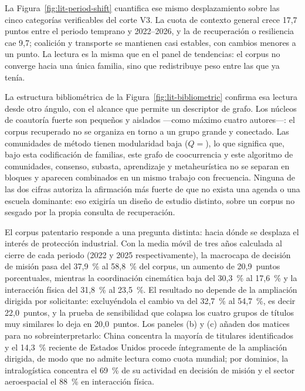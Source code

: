 La Figura~\ref{fig:lit-period-shift} cuantifica ese mismo desplazamiento sobre las
cinco categorías verificables del corte V3. La cuota de contexto general crece 17,7
puntos entre el periodo temprano y 2022--2026, y la de recuperación o resiliencia cae
9,7; coalición y transporte se mantienen casi estables, con cambios menores a un
punto. La lectura es la misma que en el panel de tendencias: el corpus no converge
hacia una única familia, sino que redistribuye peso entre las que ya tenía.

La estructura bibliométrica de la Figura~\ref{fig:lit-bibliometric} confirma esa
lectura desde otro ángulo, con el alcance que permite un descriptor de grafo. Los
núcleos de coautoría fuerte son pequeños y aislados ---como máximo cuatro
autores---: el corpus recuperado no se organiza en torno a un grupo grande y
conectado. Las comunidades de método tienen modularidad baja
($Q=$\LitMethodModularity{}), lo que significa que, bajo esta codificación de
familias, este grafo de coocurrencia y este algoritmo de comunidades, consenso,
subasta, aprendizaje y metaheurística no se separan en bloques y aparecen
combinados en un mismo trabajo con frecuencia. Ninguna de las dos cifras
autoriza la afirmación más fuerte de que no exista una agenda o una escuela
dominante: eso exigiría un diseño de estudio distinto, sobre un corpus no
sesgado por la propia consulta de recuperación.

El corpus patentario responde a una pregunta distinta: hacia dónde se desplaza el
interés de protección industrial. Con la media móvil de tres años calculada al cierre
de cada periodo (2022 y 2025 respectivamente), la macrocapa de decisión
de misión pasa del 37,9~\% al 58,8~\% del corpus, un aumento de 20,9~puntos porcentuales,
mientras la coordinación cinemática baja del 30,3~\% al 17,6~\% y la interacción física
del 31,8~\% al 23,5~\%. El resultado no depende de la ampliación dirigida por
solicitante: excluyéndola el cambio va del 32,7~\% al 54,7~\%, es decir 22,0~puntos, y la
prueba de sensibilidad que colapsa los cuatro grupos de títulos muy similares lo deja en
20,0~puntos. Los paneles (b) y (c) añaden dos matices para no sobreinterpretarlo: China
concentra la mayoría de titulares identificados y el 14,3~\% reciente de Estados Unidos
procede íntegramente de la ampliación dirigida, de modo que no admite lectura como cuota
mundial; por dominios, la intralogística concentra el 69~\% de su actividad en decisión
de misión y el sector aeroespacial el 88~\% en interacción física.
